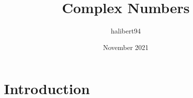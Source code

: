 \documentclass{article}
\title{Complex Numbers}
\author{halibert94 }
\date{November 2021}
\begin{document}
\maketitle

\section{Introduction}
\end{document}
